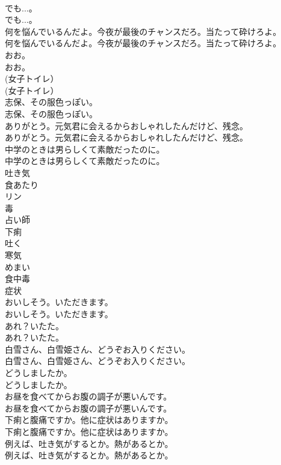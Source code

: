 \documentclass[8pt]{extreport}
\begin{document}
\begin{CJK}{UTF8}{min}
\\	でも...。	
\\	でも...。 
\\	何を悩んでいるんだよ。今夜が最後のチャンスだろ。当たって砕けろよ。	
\\	何を悩んでいるんだよ。今夜が最後のチャンスだろ。当たって砕けろよ。 
\\	おお。	
\\	おお。 
\\	(女子トイレ）	
\\	(女子トイレ） 
\\	志保、その服色っぽい。	
\\	志保、その服色っぽい。 
\\	ありがとう。元気君に会えるからおしゃれしたんだけど、残念。	
\\	ありがとう。元気君に会えるからおしゃれしたんだけど、残念。 
\\	中学のときは男らしくて素敵だったのに。	
\\	中学のときは男らしくて素敵だったのに。 
\\	吐き気
\\	食あたり
\\	リン
\\	毒
\\	占い師
\\	下痢
\\	吐く
\\	寒気
\\	めまい
\\	食中毒
\\	症状
\\	おいしそう。いただきます。	
\\	おいしそう。いただきます。 
\\	あれ？いたた。	
\\	あれ？いたた。 
\\	白雪さん、白雪姫さん、どうぞお入りください。	
\\	白雪さん、白雪姫さん、どうぞお入りください。 
\\	どうしましたか。	
\\	どうしましたか。 
\\	お昼を食べてからお腹の調子が悪いんです。	
\\	お昼を食べてからお腹の調子が悪いんです。 
\\	下痢と腹痛ですか。他に症状はありますか。	
\\	下痢と腹痛ですか。他に症状はありますか。 
\\	例えば、吐き気がするとか。熱があるとか。	
\\	例えば、吐き気がするとか。熱があるとか。 

\end{CJK}
\end{document}
